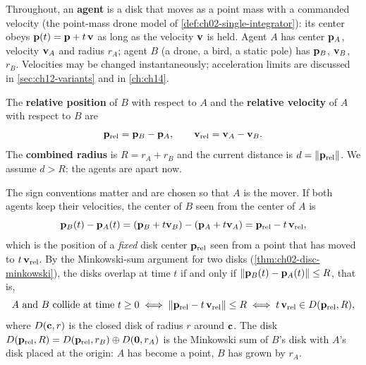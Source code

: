 Throughout, an \textbf{agent} is a disk that moves as
a point mass with a commanded velocity (the point-mass drone model of
\cref{def:ch02-single-integrator}): its center obeys $\mathbf{p}(t) = \mathbf{p} + t\,\mathbf{v}$ as long as the
velocity $\mathbf{v}$ is held. Agent $A$ has center $\mathbf{p}_A$, velocity $\mathbf{v}_A$ and
radius $r_A$; agent $B$ (a drone, a bird, a static pole) has $\mathbf{p}_B$, $\mathbf{v}_B$,
$r_B$. Velocities may be changed instantaneously; acceleration limits are
discussed in \cref{sec:ch12-variants} and in \cref{ch:ch14}.

\begin{definition}
\label{def:ch12-relative}
The \textbf{relative position} of $B$ with respect to
$A$ and the \textbf{relative velocity} of $A$ with
respect to $B$ are
\begin{equation}
  \mathbf{p}_{\mathrm{rel}} = \mathbf{p}_B - \mathbf{p}_A, \qquad
  \mathbf{v}_{\mathrm{rel}} = \mathbf{v}_A - \mathbf{v}_B .
  \label{eq:ch12-relative}
\end{equation}
The \textbf{combined radius} is $R = r_A + r_B$ and the
current distance is $d = \left\lVert \mathbf{p}_{\mathrm{rel}} \right\rVert$. We assume $d > R$: the
agents are apart now.
\end{definition}

The sign conventions matter and are chosen so that $A$ is the mover. If both
agents keep their velocities, the center of $B$ seen from the center of $A$ is
\begin{equation}
  \mathbf{p}_B(t) - \mathbf{p}_A(t)
  = (\mathbf{p}_B + t\mathbf{v}_B) - (\mathbf{p}_A + t\mathbf{v}_A)
  = \mathbf{p}_{\mathrm{rel}} - t\,\mathbf{v}_{\mathrm{rel}} ,
  \label{eq:ch12-relmotion}
\end{equation}
which is the position of a \emph{fixed} disk center $\mathbf{p}_{\mathrm{rel}}$ seen
from a point that has moved to $t\,\mathbf{v}_{\mathrm{rel}}$. By the Minkowski-sum
argument for two disks (\cref{thm:ch02-disc-minkowski}), the disks overlap at time $t$ if
and only if $\left\lVert \mathbf{p}_B(t)-\mathbf{p}_A(t) \right\rVert \le R$, that is,
\begin{equation}
  \text{$A$ and $B$ collide at time $t\ge0$}
  \iff \left\lVert \mathbf{p}_{\mathrm{rel}} - t\,\mathbf{v}_{\mathrm{rel}} \right\rVert \le R
  \iff t\,\mathbf{v}_{\mathrm{rel}} \in D(\mathbf{p}_{\mathrm{rel}},R),
  \label{eq:ch12-collision}
\end{equation}
where $D(\mathbf{c},r)$ is the closed disk of radius $r$ around $\mathbf{c}$.
The disk $D(\mathbf{p}_{\mathrm{rel}},R) = D(\mathbf{p}_{\mathrm{rel}},r_B)
\oplus D(\mathbf{0},r_A)$ is the Minkowski sum of $B$'s disk with $A$'s disk placed at the origin: $A$ has
become a point, $B$ has grown by $r_A$.

